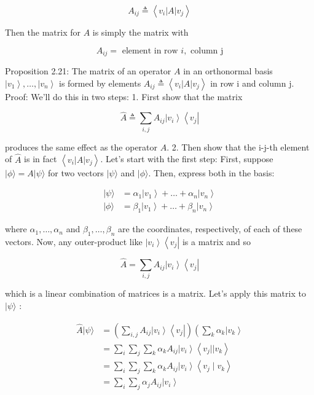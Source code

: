 \documentclass[main.tex]{subfiles}
\begin{document}
    $$
    A_{i j} \triangleq\left\langle v_{i}|A| v_{j}\right\rangle
    $$
    
    Then the matrix for $A$ is simply the matrix with
    
    $$
    A_{i j}=\text { element in row } i, \text { column } \mathrm{j}
    $$
    
    Proposition 2.21: The matrix of an operator $A$ in an orthonormal basis $\left|v_{1}\right\rangle, \ldots,\left|v_{n}\right\rangle$ is formed by elements $A_{i j} \triangleq\left\langle v_{i}|A| v_{j}\right\rangle$ in row i and column $\mathrm{j}$. Proof: We'll do this in two steps: 1. First show that the matrix
   
    $$
    \hat{A} \triangleq \sum_{i, j} A_{i j}\left|v_{i}\right\rangle\left\langle v_{j}\right|
    $$
    
    produces the same effect as the operator $A$. 2. Then show that the i-j-th element of $\hat{A}$ is in fact $\left\langle v_{i}|A| v_{j}\right\rangle$. Let's start with the first step: First, suppose $|\phi\rangle=A|\psi\rangle$ for two vectors $|\psi\rangle$ and $|\phi\rangle$. Then, express both in the basis:
    
    $$
    \begin{aligned}
    |\psi\rangle &=\alpha_{1}\left|v_{1}\right\rangle+\ldots+\alpha_{n}\left|v_{n}\right\rangle \\
    |\phi\rangle &=\beta_{1}\left|v_{1}\right\rangle+\ldots+\beta_{n}\left|v_{n}\right\rangle
    \end{aligned}
    $$
    
    where $\alpha_{1}, \ldots, \alpha_{n}$ and $\beta_{1}, \ldots, \beta_{n}$ are the coordinates, respectively, of each of these vectors. Now, any outer-product like $\left|v_{i}\right\rangle\left\langle v_{j}\right|$ is a matrix and so
    
    $$
    \hat{A}=\sum_{i, j} A_{i j}\left|v_{i}\right\rangle\left\langle v_{j}\right|
    $$
    
    which is a linear combination of matrices is a matrix. Let's apply this matrix to $|\psi\rangle$ :
    
    $$
    \begin{aligned}
    \hat{A}|\psi\rangle &=\left(\sum_{i, j} A_{i j}\left|v_{i}\right\rangle\left\langle v_{j}\right|\right)\left(\sum_{k} \alpha_{k}\left|v_{k}\right\rangle\right.\\
    &=\sum_{i} \sum_{j} \sum_{k} \alpha_{k} A_{i j}\left|v_{i}\right\rangle\left\langle v_{j}|| v_{k}\right\rangle \\
    &=\sum_{i} \sum_{j} \sum_{k} \alpha_{k} A_{i j}\left|v_{i}\right\rangle\left\langle v_{j} \mid v_{k}\right\rangle \\
    &=\sum_{i} \sum_{j} \alpha_{j} A_{i j}\left|v_{i}\right\rangle
    \end{aligned}
    $$
    
\end{document}
